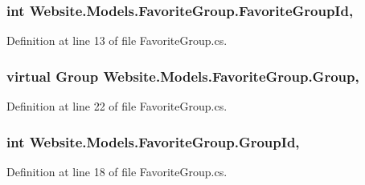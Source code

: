 \subsubsection[{Favorite\+Group\+Id}]{\setlength{\rightskip}{0pt plus 5cm}int Website.\+Models.\+Favorite\+Group.\+Favorite\+Group\+Id\hspace{0.3cm}{\ttfamily [get]}, {\ttfamily [set]}}\label{class_website_1_1_models_1_1_favorite_group_a55f48a56d7c524d4800d973c6044a86b}


Definition at line 13 of file Favorite\+Group.\+cs.

\hypertarget{class_website_1_1_models_1_1_favorite_group_a50bc0bcb227249f628ae97ddd6d134ff}{}
\subsubsection[{Group}]{\setlength{\rightskip}{0pt plus 5cm}virtual {\bf Group} Website.\+Models.\+Favorite\+Group.\+Group\hspace{0.3cm}{\ttfamily [get]}, {\ttfamily [set]}}\label{class_website_1_1_models_1_1_favorite_group_a50bc0bcb227249f628ae97ddd6d134ff}


Definition at line 22 of file Favorite\+Group.\+cs.

\hypertarget{class_website_1_1_models_1_1_favorite_group_a85b7575c1097a2a12db7d2f2aa43df24}{}
\subsubsection[{Group\+Id}]{\setlength{\rightskip}{0pt plus 5cm}int Website.\+Models.\+Favorite\+Group.\+Group\+Id\hspace{0.3cm}{\ttfamily [get]}, {\ttfamily [set]}}\label{class_website_1_1_models_1_1_favorite_group_a85b7575c1097a2a12db7d2f2aa43df24}


Definition at line 18 of file Favorite\+Group.\+cs.

\hypertarget{class_website_1_1_models_1_1_favorite_group_a024158ace51660f77eec7d6a40b67c7a}{}
